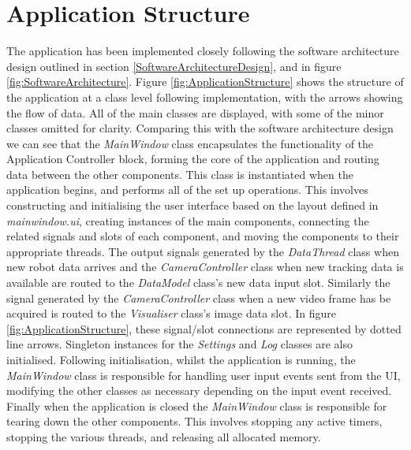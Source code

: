 
\section{Application Structure}
The application has been implemented closely following the software architecture design outlined in section \ref{SoftwareArchitectureDesign}, and in figure \ref{fig:SoftwareArchitecture}. Figure \ref{fig:ApplicationStructure} shows the structure of the application at a class level following implementation, with the arrows showing the flow of data. All of the main classes are displayed, with some of the minor classes omitted for clarity. Comparing this with the software architecture design we can see that the \textit{MainWindow} class encapsulates the functionality of the Application Controller block, forming the core of the application and routing data between the other components. This class is instantiated when the application begins, and performs all of the set up operations. This involves constructing and initialising the user interface based on the layout defined in \textit{mainwindow.ui}, creating instances of the main components, connecting the related signals and slots of each component, and moving the components to their appropriate threads. The output signals generated by the \textit{DataThread} class when new robot data arrives and the \textit{CameraController} class when new tracking data is available are routed to the \textit{DataModel} class's new data input slot. Similarly the signal generated by the \textit{CameraController} class when a new video frame has be acquired is routed to the \textit{Visualiser} class's image data slot. In figure \ref{fig:ApplicationStructure}, these signal/slot connections are represented by dotted line arrows. Singleton instances for the \textit{Settings} and \textit{Log} classes are also initialised. Following initialisation, whilst the application is running, the \textit{MainWindow} class is responsible for handling user input events sent from the UI, modifying the other classes as necessary depending on the input event received. Finally when the application is closed the \textit{MainWindow} class is responsible for tearing down the other components. This involves stopping any active timers, stopping the various threads, and releasing all allocated memory.


